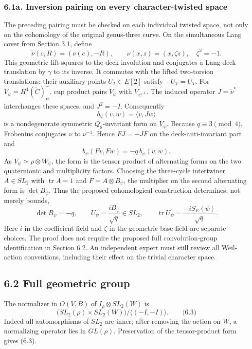 \documentclass[
  11pt,
  a4paper,
]{article}
\begin{document}
\subsubsection{6.1a. Inversion pairing on every character-twisted space}
The preceding pairing must be checked on each individual twisted space,
not only on the cohomology of the original genus-three curve. On the
simultaneous Lang cover from Section 3.1, define
\[
 \widetilde\nu(c,R)=(\nu(c),-R),\qquad
 \nu(x,z)=(x,\zeta z),\quad\zeta^2=-1.
\]
This geometric lift squares to the deck involution and conjugates a
Lang-deck translation by \(\gamma\) to its inverse. It commutes with
the lifted two-torsion translations: their auxiliary points
\(U_T\in E[2]\) satisfy \(-U_T=U_T\).
For \(V_\psi=H^1(\widetilde C)^{-}_{\psi}\), cup product pairs
\(V_\psi\) with \(V_{\psi^{-1}}\). The induced operator
\(J=\widetilde\nu^*\) interchanges these spaces, and \(J^2=-I\).
Consequently
\[
 b_\psi(v,w)=\langle v,Jw\rangle
\]
is a nondegenerate symmetric \(Q_8\)-invariant form on \(V_\psi\).
Because \(q\equiv3\pmod4\), Frobenius conjugates \(\nu\) to
\(\nu^{-1}\). Hence \(FJ=-JF\) on the deck-anti-invariant part and
\[
 \boxed{b_\psi(Fv,Fw)=-q\,b_\psi(v,w).}
 \tag{N.1}
\]
As \(V_\psi\simeq\rho\otimes W_\psi\), the form is the tensor
product of alternating forms on the two quaternionic and multiplicity
factors. Choosing the three-cycle intertwiner \(A\in SL_2\) with
\(\operatorname{tr}A=1\) and \(F=A\otimes B_\psi\), the multiplier
on the second alternating form is \(\det B_\psi\). Thus the proposed
cohomological construction determines, not merely bounds,
\[
 \boxed{\det B_\psi=-q,\qquad
 U_\psi=\frac{iB_\psi}{\sqrt q}\in SL_2,\qquad
 \operatorname{tr}U_\psi=\frac{-iS_E(\psi)}{\sqrt q}.}
 \tag{N.2}
\]
Here \(i\) in the coefficient field and \(\zeta\) in the geometric
base field are separate choices. The proof does not require the
proposed full convolution-group identification in Section 6.2.
An independent expert must still review all Weil-action conventions,
including their effect on the trivial character space.

\subsection{6.2 Full geometric group}\label{full-geometric-group}

The normalizer in \(O(V,B)\) of \(I_\rho\otimes SL_2(W)\) is \[
\bigl(SL_2(\rho)\times SL_2(W)\bigr)/\langle(-I,-I)\rangle.
\qquad \text{(6.3)}
\] Indeed all automorphisms of \(SL_2\) are inner; after removing the
action on \(W\), a normalizing operator lies in \(GL(\rho)\).
Preservation of the tensor-product form gives (6.3).
\end{document}
